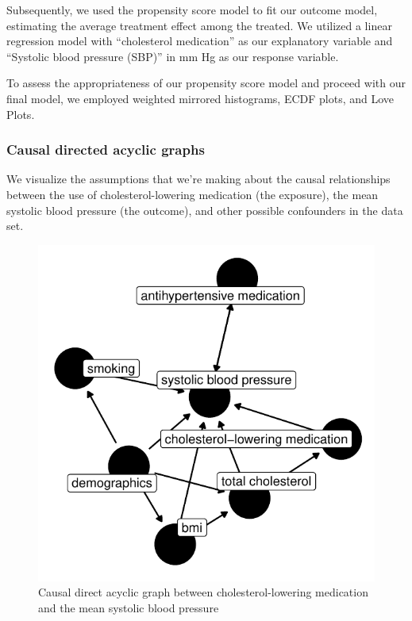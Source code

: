 \documentclass[useAMS,usenatbib,referee]{biom}
\begin{document}
Subsequently, we used the propensity score model to fit our outcome
model, estimating the average treatment effect among the treated. We
utilized a linear regression model with ``cholesterol medication'' as
our explanatory variable and ``Systolic blood pressure (SBP)'' in mm Hg
as our response variable.

To assess the appropriateness of our propensity score model and proceed
with our final model, we employed weighted mirrored histograms, ECDF
plots, and Love Plots.

\hypertarget{causal-directed-acyclic-graphs}{%
\subsubsection{Causal directed acyclic
graphs}\label{causal-directed-acyclic-graphs}}

We visualize the assumptions that we're making about the causal
relationships between the use of cholesterol-lowering medication (the
exposure), the mean systolic blood pressure (the outcome), and other
possible confounders in the data set.

\begin{figure}
\centering
\includegraphics{final-project_files/figure-latex/fig_dag-1.pdf}
\caption{Causal direct acyclic graph between cholesterol-lowering
medication and the mean systolic blood pressure}
\end{figure}
\end{document}
